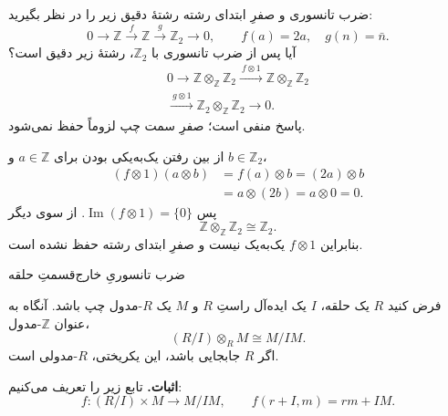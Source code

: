 \begin{frame}[t]{ضرب تانسوری و صفرِ ابتدای رشته}
\label{lec20:exactness-example}
رشتهٔ دقیق زیر را در نظر بگیرید:
\[
    0\longrightarrow\mathbb Z\xrightarrow{\ f\ }\mathbb Z
    \xrightarrow{\ g\ }\mathbb Z_2\longrightarrow0,
\qquad f(a)=2a,\quad g(n)=\bar n.
\]
آیا پس از ضرب تانسوری با \(\mathbb Z_2\)، رشتهٔ زیر دقیق است؟
\[
\begin{gathered}
0\longrightarrow\mathbb Z\otimes_{\mathbb Z}\mathbb Z_2
\xrightarrow{\ f\otimes1\ }\mathbb Z\otimes_{\mathbb Z}\mathbb Z_2\\
\xrightarrow{\ g\otimes1\ }\mathbb Z_2\otimes_{\mathbb Z}\mathbb Z_2
\longrightarrow0.
\end{gathered}
\]
پاسخ منفی است؛ صفرِ سمت چپ لزوماً حفظ نمی‌شود.
\end{frame}

\begin{frame}[t]{از بین رفتن یک‌به‌یکی بودن}
\label{lec20:noninjective-tensor-map}
برای \(a\in\mathbb Z\) و \(b\in\mathbb Z_2\)،
\[
\begin{aligned}
(f\otimes1)(a\otimes b)
 &=f(a)\otimes b=(2a)\otimes b\\
 &=a\otimes(2b)=a\otimes0=0.
\end{aligned}
\]
پس \(\operatorname{Im}(f\otimes1)=\{0\}\). از سوی دیگر
\[
    \mathbb Z\otimes_{\mathbb Z}\mathbb Z_2\cong\mathbb Z_2.
\]
بنابراین \(f\otimes1\) یک‌به‌یک نیست و صفرِ ابتدای رشته حفظ نشده است.
\end{frame}

\begin{frame}[t]{ضرب تانسوریِ خارج‌قسمتِ حلقه}
\label{lec20:quotient-tensor}
\begin{theorem}
فرض کنید \(R\) یک حلقه، \(I\) یک ایده‌آل راستِ \(R\) و \(M\) یک \(R\)-مدول چپ باشد. آنگاه به عنوان \(\mathbb Z\)-مدول،
\[
    (R/I)\otimes_R M\cong M/IM.
\]
اگر \(R\) جابجایی باشد، این یکریختی، \(R\)-مدولی است.
\end{theorem}
\textbf{اثبات.} تابع زیر را تعریف می‌کنیم:
\[
    f:(R/I)\times M\longrightarrow M/IM,
    \qquad f(r+I,m)=rm+IM.
\]
\end{frame}

